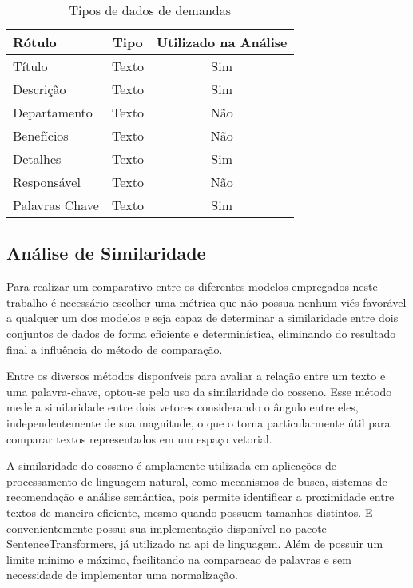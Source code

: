 \begin{table}[H]
    \caption{Tipos de dados de demandas}
    \label{tab:dados_demandas}
    \begin{tabular}{lcc}
        \hline
        \textbf{Rótulo} & \textbf{Tipo} & \textbf{Utilizado na Análise} \\ \hline
        Título          & Texto         & Sim                           \\
        Descrição       & Texto         & Sim                           \\
        Departamento    & Texto         & Não                           \\
        Benefícios      & Texto         & Não                           \\
        Detalhes        & Texto         & Sim                           \\
        Responsável     & Texto         & Não                           \\
        Palavras Chave  & Texto         & Sim                           \\ \hline
    \end{tabular}
    \fonte{}
\end{table}

\subsection{Análise de Similaridade}\label{subsec:cossine_similarity}

Para realizar um comparativo entre os diferentes modelos empregados neste trabalho é necessário escolher uma métrica que não possua nenhum viés favorável a qualquer um dos modelos e seja capaz de determinar a similaridade entre dois conjuntos de dados de forma eficiente e determinística, eliminando do resultado final a influência do método de comparação.

Entre os diversos métodos disponíveis para avaliar a relação entre um texto e uma palavra-chave, optou-se pelo uso da similaridade do cosseno. Esse método mede a similaridade entre dois vetores considerando o ângulo entre eles, independentemente de sua magnitude, o que o torna particularmente útil para comparar textos representados em um espaço vetorial.

A similaridade do cosseno é amplamente utilizada em aplicações de processamento de linguagem natural, como mecanismos de busca, sistemas de recomendação e análise semântica, pois permite identificar a proximidade entre textos de maneira eficiente, mesmo quando possuem tamanhos distintos. E convenientemente possui sua implementação disponível no pacote SentenceTransformers, já utilizado na \gls{api} de linguagem. Além de possuir um limite mínimo e máximo, facilitando na comparacao de palavras e sem necessidade de implementar uma normalização.

